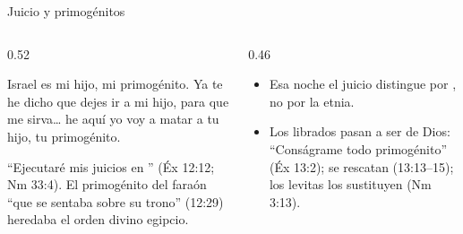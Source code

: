 \begin{frame}{Juicio y primogénitos}
\begin{columns}[t,onlytextwidth]
\begin{column}{0.52\textwidth}
\begin{cita}Israel es mi hijo, mi primogénito. Ya te he dicho que dejes ir a mi hijo, para que me sirva\ldots{} he aquí yo voy a matar a tu hijo, tu primogénito.\end{cita}
\small\RaggedRight ``Ejecutaré mis juicios en '' (Éx 12:12; Nm 33:4). El primogénito del faraón ``que se sentaba sobre su trono'' (12:29) heredaba el orden divino egipcio.
\end{column}
\begin{column}{0.46\textwidth}\small
\begin{itemize}
\item Esa noche el juicio distingue por , no por la etnia.
\item Los librados pasan a ser de Dios: ``Conságrame todo primogénito'' (Éx 13:2); se rescatan (13:13--15); los levitas los sustituyen (Nm 3:13).
\end{itemize}
\end{column}
\end{columns}
\end{frame}


